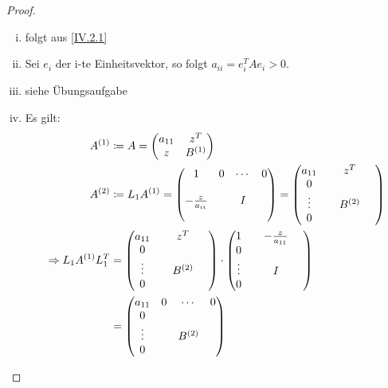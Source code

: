 \documentclass[ngerman,fontsize=11pt, paper=a4, parskip=half, titlepage=true, toc=bib]{scrbook}
\begin{document}
\begin{proof}
\begin{enumerate}[i)]
	\item folgt aus \eqref{IV.2.1}
	\item Sei $e_i$ der i-te Einheitsvektor, so folgt $a_{ii} = e_{i}^TAe_i > 0$.
	\item siehe Übungsaufgabe
	\item Es gilt:
			\begin{align*}
				A^{(1)} &\coloneqq A = \begin{pmatrix}
															a_{11} & z^T \\ 
															z			& B^{(1)}
														\end{pmatrix} \\
				A^{(2)}	&\coloneqq L_1 A^{(1)} 
								= \begin{pmatrix}
											1 & 0 & \dotsm & 0 \\ \\
											-\frac{z}{a_{ii}} && I \\ ~
										\end{pmatrix} 
								= \begin{pmatrix}
											a_{11} &  & z^T & ~ \\ 
											0 \\
											\vdots && B^{(2)} \\ 
											0
										\end{pmatrix} \\
				\Rightarrow L_1A^{(1)}L_1^T  
				&= \begin{pmatrix}
							a_{11} &  & z^T & ~ \\ 
							0 \\
							\vdots && B^{(2)} \\ 
							0
						\end{pmatrix} 
						\cdot  \begin{pmatrix}
										1 &  &	-\frac{z}{a_{11}} & ~ \\ 
										0 \\\nocite{*}
										\vdots && I \\ 
										0
									\end{pmatrix}\\
				&= \begin{pmatrix}
							a_{11} & 0 & \cdots & 0\\ 
							0 \\
							\vdots && B^{(2)} \\ 
							0
						\end{pmatrix} 

\end{align*}
\end{enumerate}
\end{proof}
\end{document}
